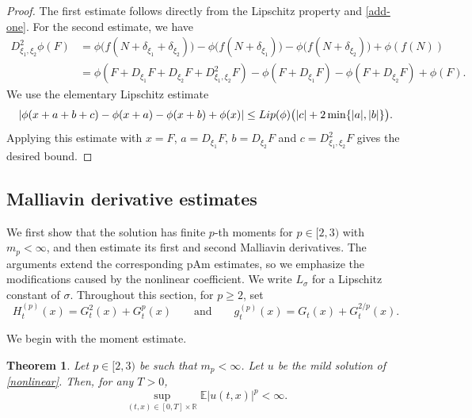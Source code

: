 \documentclass[10pt,a4paper]{amsart}
\newtheorem{theorem}{Theorem}[section]
\def\bE{\mathbb{E}}
\def\bR{\mathbb{R}}
\begin{document}
\begin{proof}
The first estimate follows directly from the Lipschitz property and
\eqref{add-one}. For the second estimate, we have
\begin{align*}
D^2_{\xi_1,\xi_2}\phi(F)
&=
\phi\big(f(N+\delta_{\xi_1}+\delta_{\xi_2})\big)
-
\phi\big(f(N+\delta_{\xi_1})\big)
-
\phi\big(f(N+\delta_{\xi_2})\big)
+
\phi(f(N)) \\
&=
\phi\left(
F+D_{\xi_1}F+D_{\xi_2}F+D^2_{\xi_1,\xi_2}F
\right)
-
\phi\left(F+D_{\xi_1}F\right)
-
\phi\left(F+D_{\xi_2}F\right)
+
\phi(F).
\end{align*}
We use the elementary Lipschitz estimate
\[
|\phi(x+a+b+c)-\phi(x+a)-\phi(x+b)+\phi(x)|
\le
{\rm Lip}(\phi)
\big(
|c|+2\min\{|a|,|b|\}
\big).
\]
Applying this estimate with $x=F$,  $a=D_{\xi_1}F$, $b=D_{\xi_2}F$ and $c=D^2_{\xi_1,\xi_2}F$ gives the desired bound.

\end{proof}













\subsection{Malliavin derivative estimates}
 We first show that the solution has finite $p$-th moments for
$p\in[2,3)$ with $m_p<\infty$, and then estimate its first and second
Malliavin derivatives. The arguments extend the corresponding pAm estimates,
so we emphasize the modifications caused by the nonlinear coefficient. We write $L_\sigma$ for a Lipschitz constant of $\sigma$. 
Throughout this section, for $p\ge2$, set
\[
H_t^{(p)}(x)
=
G_t^2(x)+G_t^p(x) \qquad \text{and}\qquad g_t^{(p)}(x)
=
G_t(x)+G_t^{2/p}(x).
\]



We begin with the moment estimate.
\begin{theorem}
\label{thm-u-pth-moment-nonlinear}
Let $p\in [2,3)$ be such that $m_p<\infty$. Let $u$ be the mild solution of
\eqref{nonlinear}. Then, for any $T>0$,
\begin{equation}
\label{u-pth-moment}
    \sup_{(t,x)\in [0,T]\times \bR} \bE|u(t,x)|^p <\infty .
\end{equation}
\end{theorem}
\end{document}
